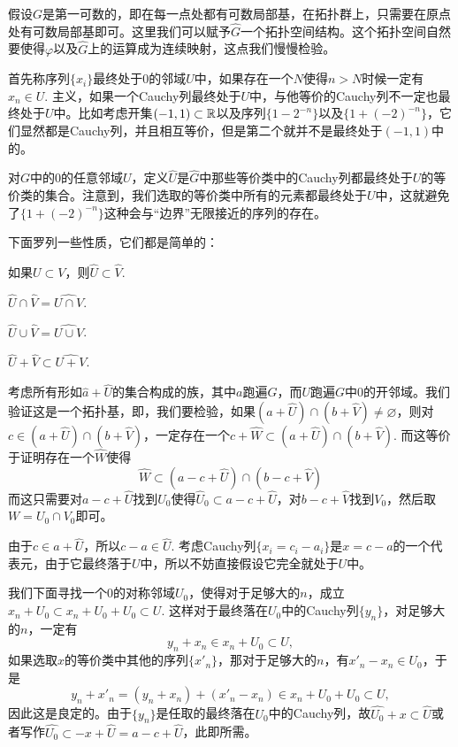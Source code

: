 \begin{para}
	假设$G$是第一可数的，即在每一点处都有可数局部基，在拓扑群上，只需要在原点处有可数局部基即可。这里我们可以赋予$\hat G$一个拓扑空间结构。这个拓扑空间自然要使得$\varphi$以及$\hat G$上的运算成为连续映射，这点我们慢慢检验。

	首先称序列$\{x_i\}$最终处于$0$的邻域$U$中，如果存在一个$N$使得$n>N$时候一定有$x_n\in U$. 主义，如果一个Cauchy列最终处于$U$中，与他等价的Cauchy列不一定也最终处于$U$中。比如考虑开集$(-1,1)\subset \mathbb{R}$以及序列$\{1-2^{-n}\}$以及$\{1+(-2)^{-n}\}$，它们显然都是Cauchy列，并且相互等价，但是第二个就并不是最终处于$(-1,1)$中的。

	对$G$中的$0$的任意邻域$U$，定义$\hat U$是$\hat G$中那些等价类中的Cauchy列都最终处于$U$的等价类的集合。注意到，我们选取的等价类中所有的元素都最终处于$U$中，这就避免了$\{1+(-2)^{-n}\}$这种会与“边界”无限接近的序列的存在。

	下面罗列一些性质，它们都是简单的：
	\begin{compactenum}
	\item 如果$U\subset V$，则$\hat U\subset \hat V$.
	\item $\hat{U}\cap \hat{V}=\widehat{U\cap V}$.

	\item $\hat{U}\cup \hat{V}=\widehat{U\cup V}$.
	\item $\hat{U}+\hat{V}\subset \widehat{U+V}$.
	\end{compactenum}

	考虑所有形如$\hat{a}+\hat{U}$的集合构成的族，其中$a$跑遍$\hat G$，而$U$跑遍$G$中$0$的开邻域。我们验证这是一个拓扑基，即，我们要检验，如果$(a+\hat{U})\cap (b+\hat{V})\neq \varnothing$，则对$c\in (a+\hat{U})\cap (b+\hat{V})$，一定存在一个$c+\hat{W}\subset (a+\hat{U})\cap (b+\hat{V})$. 而这等价于证明存在一个$\hat{W}$使得
	\[
	\hat{W}\subset (a-c+\hat{U})\cap (b-c+\hat{V})
	\]
	而这只需要对$a-c+\hat{U}$找到$U_0$使得$\hat{U}_0\subset a-c+\hat{U}$，对$b-c+\hat{V}$找到$V_0$，然后取$W=U_0\cap V_0$即可。

	由于$c\in a+\hat{U}$，所以$c-a\in \hat{U}$. 考虑Cauchy列$\{x_i=c_i-a_i\}$是$x=c-a$的一个代表元，由于它最终落于$U$中，所以不妨直接假设它完全就处于$U$中。

	我们下面寻找一个$0$的对称邻域$U_0$，使得对于足够大的$n$，成立$x_n+U_0\subset x_n+U_0+U_0\subset U$. 这样对于最终落在$U_0$中的Cauchy列$\{y_n\}$，对足够大的$n$，一定有
	\[
	y_n+x_n\in x_n+U_0\subset U,
	\]
	如果选取$x$的等价类中其他的序列$\{x'_n\}$，那对于足够大的$n$，有$x'_n-x_n\in U_0$，于是
	\[
	y_n+x'_n=(y_n+x_n)+(x'_n-x_n)\in x_n+U_0+U_0\subset U,
	\]
	因此这是良定的。由于$\{y_n\}$是任取的最终落在$U_0$中的Cauchy列，故$\hat{U_0}+x\subset \hat{U}$或者写作$\hat{U_0}\subset -x+\hat{U}=a-c+\hat{U}$，此即所需。


\end{para}
